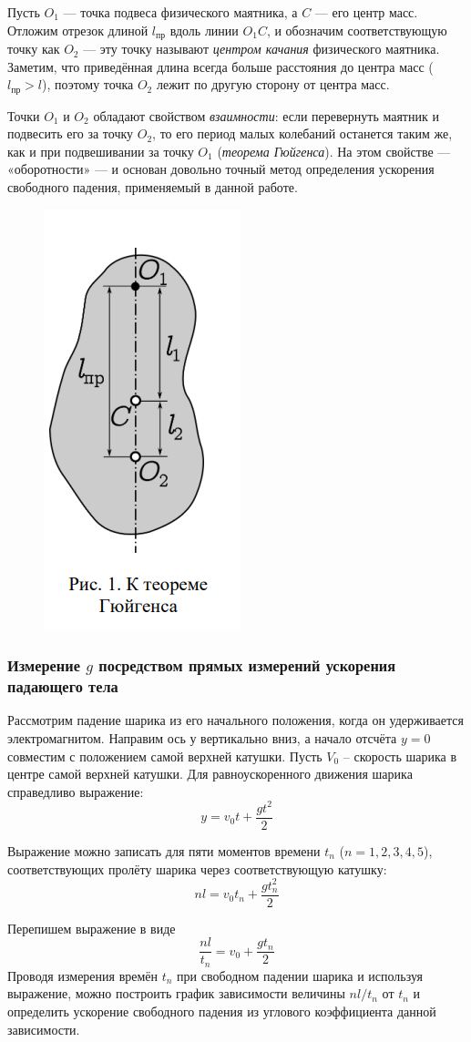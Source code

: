 \documentclass[a4paper, 12pt]{article}
\begin{document}
Пусть $O_{1}$ — точка подвеса физического маятника, а 
$C$ — его центр масс. Отложим отрезок длиной $l_{\text{пр}}$ вдоль линии $O_{1}C$, и обозначим соответствующую точку как $O_{2}$ — эту точку называют \textit{центром качания} физического маятника. Заметим, что приведённая длина всегда 
больше расстояния до центра масс ($l_{\text{пр}} > l$), поэтому 
точка $O_{2}$ лежит по другую сторону от центра масс.

Точки $O_{1}$ и $O_{2}$ обладают свойством \textit{взаимности}: 
если перевернуть маятник и подвесить его за точку $O_{2}$, 
то его период малых колебаний останется таким же, как 
и при подвешивании за точку $O_{1}$ (\textit{теорема Гюйгенса}). 
На этом свойстве — «оборотности» — и основан довольно точный метод определения ускорения свободного падения, применяемый в данной работе.

\begin{figure}[H]
\centering
\includegraphics[width=.21\textwidth]{image_1.png}
\end{figure}

\begin{center}
    
\subsubsection*{Измерение $g$ посредством прямых измерений ускорения падающего тела}
Рассмотрим падение шарика из его начального положения, когда он удерживается электромагнитом. Направим ось у вертикально вниз, а начало отсчёта $y = 0$ совместим с положением самой верхней катушки.
Пусть $V_{0}$ – скорость шарика в центре самой верхней катушки. Для равноускоренного движения шарика справедливо выражение:
$$y = v_{0}t + \frac{gt^2}{2}$$

Выражение можно записать для пяти моментов времени $t_{n}$ ($n = 1, 2, 3, 4, 5$), 
соответствующих пролёту шарика через соответствующую катушку:
$$nl = v_{0}t_{n} + \frac{gt_{n}^2}{2}$$

Перепишем выражение в виде
$$\frac{nl}{t_{n}} = v_{0} + \frac{gt_{n}}{2}$$
Проводя измерения времён $t_{n}$ при свободном падении шарика и используя выражение, можно построить график зависимости величины $nl/t_{n}$ от $t_{n}$ и 
определить ускорение свободного падения из углового коэффициента данной
зависимости.

\end{center}
\end{document}
